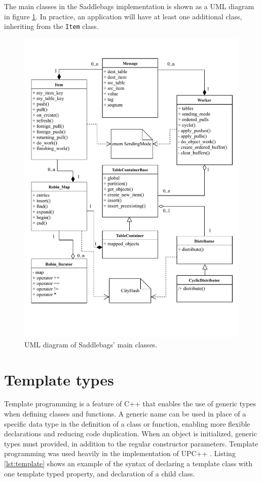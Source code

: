 \documentclass{uit-report}
\begin{document}

The main classes in the Saddlebags implementation is shown as a UML diagram in figure \ref{fig:uml}. In practice, an application will have at least one additional class, inheriting from the \texttt{Item} class. 



\begin{figure}[H]
	\centering
	\includegraphics[width=15cm]{illustrations/uml.pdf}
	\caption{UML diagram of Saddlebags' main classes.}
	\label{fig:uml}
\end{figure}


\section{Template types} \label{section:templates}
Template programming is a feature of C++ that enables the use of generic types when defining classes and functions. A generic name can be used in place of a specific data type in the definition of a class or function, enabling more flexible declarations and reducing code duplication. When an object is initialized, generic types must provided, in addition to the regular constructor parameters. Template programming was used heavily in the implementation of UPC++ \cite{upc_language_specification}. Listing \ref{lst:template} shows an example of the syntax of declaring a template class with one template typed property, and declaration of a child class.
\end{document}
